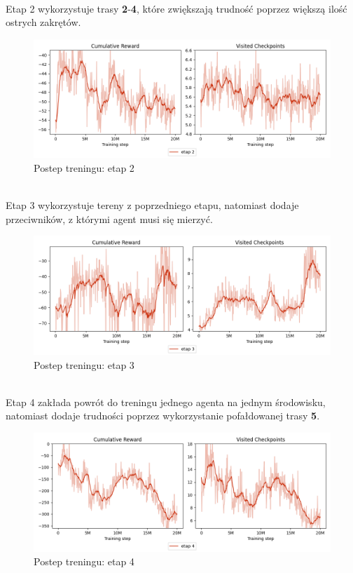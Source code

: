 \phantom{.}\\
Etap 2 wykorzystuje trasy \textbf{2}-\textbf{4}, które zwiększają trudność poprzez większą ilość ostrych zakrętów.
\begin{figure}[H]
    \centering
    \includegraphics[width=\textwidth]{graphs/training_progress_2.png}
    \caption{Postep treningu: etap 2}
    \label{fig}
\end{figure}
\phantom{.}\\
Etap 3 wykorzystuje tereny z poprzedniego etapu, natomiast dodaje przeciwników, z którymi agent musi się mierzyć.
\begin{figure}[H]
    \centering
    \includegraphics[width=\textwidth]{graphs/training_progress_3.png}
    \caption{Postep treningu: etap 3}
    \label{fig}
\end{figure}
\phantom{.}\\
Etap 4 zakłada powrót do treningu jednego agenta na jednym środowisku, natomiast dodaje trudności poprzez wykorzystanie pofałdowanej trasy \textbf{5}.
\begin{figure}[H]
    \centering
    \includegraphics[width=\textwidth]{graphs/training_progress_4.png}
    \caption{Postep treningu: etap 4}
    \label{fig}
\end{figure}
